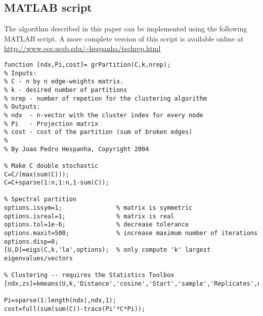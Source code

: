 \documentclass[10pt]{article}
\begin{document}
\subsection{MATLAB script}

The algorithm described in this paper can be implemented using the
following MATLAB script. A more complete version of this script is
available online at
\url{http://www.ece.ucsb.edu/~hespanha/techrep.html}

{\small
\begin{verbatim}
function [ndx,Pi,cost]= grPartition(C,k,nrep);
% Inputs:
% C - n by n edge-weights matrix.
% k - desired number of partitions
% nrep - number of repetion for the clustering algorithm 
% Outputs:
% ndx  - n-vector with the cluster index for every node 
% Pi   - Projection matrix 
% cost - cost of the partition (sum of broken edges)
%
% By Joao Pedro Hespanha, Copyright 2004

% Make C double stochastic
C=C/(max(sum(C)));
C=C+sparse(1:n,1:n,1-sum(C));

% Spectral partition
options.issym=1;               % matrix is symmetric
options.isreal=1;              % matrix is real
options.tol=1e-6;              % decrease tolerance 
options.maxit=500;             % increase maximum number of iterations
options.disp=0;
[U,D]=eigs(C,k,'la',options);  % only compute 'k' largest eigenvalues/vectors

% Clustering -- requires the Statistics Toolbox
[ndx,zs]=kmeans(U,k,'Distance','cosine','Start','sample','Replicates',nrep);

Pi=sparse(1:length(ndx),ndx,1);
cost=full(sum(sum(C))-trace(Pi'*C*Pi));
\end{verbatim}
}

%


\end{document}
